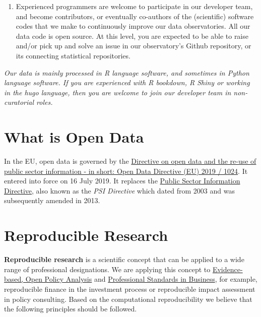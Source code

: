 \documentclass[
  a4paper,
  openany, a4paper, oneside]{book}
\begin{document}
\begin{enumerate}
\item
  Experienced programmers are welcome to participate in our developer team, and become contributors, or eventually co-authors of the (scientific) software codes that we make to continuously improve our data observatories. All our data code is open source. At this level, you are expected to be able to raise and/or pick up and solve an issue in our observatory's Github repository, or its connecting statistical repositories.
\end{enumerate}

\emph{Our data is mainly processed in R language software, and sometimes in Python language software. If you are experienced with R bookdown, R Shiny or working in the hugo language, then you are welcome to join our developer team in non-curatorial roles.}

\hypertarget{open-data}{%
\section{What is Open Data}\label{open-data}}

In the EU, open data is governed by the \href{https://eur-lex.europa.eu/legal-content/EN/TXT/?qid=1561563110433\&uri=CELEX:32019L1024}{Directive on open data and the re-use of public sector information - in short: Open Data Directive (EU) 2019 / 1024}. It entered into force on 16 July 2019. It replaces the \href{https://eur-lex.europa.eu/legal-content/en/ALL/?uri=CELEX:32003L0098}{Public Sector Information Directive}, also known as the \emph{PSI Directive} which dated from 2003 and was subsequently amended in 2013.

\hypertarget{reproducible-research}{%
\section{Reproducible Research}\label{reproducible-research}}

\textbf{Reproducible research} is a scientific concept that can be applied to a wide range of professional designations. We are applying this concept to \protect\hyperlink{opa}{Evidence-based, Open Policy Analysis} and \protect\hyperlink{business-professional-standards}{Professional Standards in Business},
for example, reproducible finance in the investment process or reproducible impact assessment in policy consulting. Based on the computational reproducibility we believe that the following principles should be followed.
\end{document}
